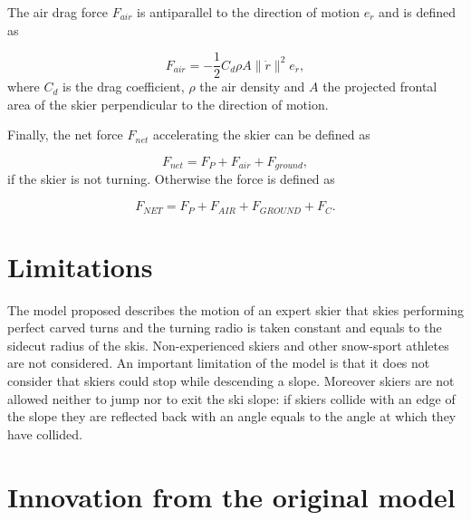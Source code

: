 \documentclass[12pt,a4paper,twoside]{book}
\newcommand{\norm}[1]{\lVert#1\rVert}
\begin{document}
The air drag force $F_{air}$ is antiparallel to the direction of motion $e_{\dot{r}}$ and is defined as

\begin{equation}
F_{air}=-\frac{1}{2}C_d \rho A \norm{\dot{r}}^2 e_{\dot{r}},
\end{equation}
where $C_d$ is the drag coefficient, $\rho$ the air density and $A$ the projected frontal area of the skier perpendicular to the direction of motion.

Finally, the net force $F_{net}$ accelerating the skier can be defined as

\begin{equation}\label{physical_resultant_nt}
F_{net}=F_P + F_{air} + F_{ground},
\end{equation}
if the skier is not turning. Otherwise the force is defined as

\begin{equation}\label{physical_resultant}
F_{NET}=F_P + F_{AIR} + F_{GROUND} + F_C.
\end{equation}

\section{Limitations}
The model proposed describes the motion of an expert skier that skies performing perfect carved turns and the turning radio is taken constant and equals to the sidecut radius of the skis. Non-experienced skiers and other snow-sport athletes are not considered. An important limitation of the model is that it does not consider that skiers could stop while descending a slope. Moreover skiers are not allowed neither to jump nor to exit the ski slope: if skiers collide with an edge of the slope they are reflected back with an angle equals to the angle at which they have collided.

\section{Innovation from the original model}
\end{document}
